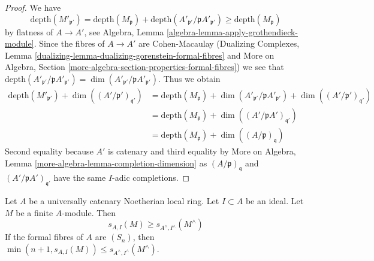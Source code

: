 \begin{proof}
We have
$$
\text{depth}(M'_{\mathfrak p'}) =
\text{depth}(M_\mathfrak p) +
\text{depth}(A'_{\mathfrak p'}/\mathfrak p A'_{\mathfrak p'})
\geq \text{depth}(M_\mathfrak p)
$$
by flatness of $A \to A'$, see
Algebra, Lemma \ref{algebra-lemma-apply-grothendieck-module}.
Since the fibres of $A \to A'$ are Cohen-Macaulay
(Dualizing Complexes, Lemma
\ref{dualizing-lemma-dualizing-gorenstein-formal-fibres} and
More on Algebra, Section
\ref{more-algebra-section-properties-formal-fibres})
we see that
$\text{depth}(A'_{\mathfrak p'}/\mathfrak p A'_{\mathfrak p'}) =
\dim(A'_{\mathfrak p'}/\mathfrak p A'_{\mathfrak p'})$.
Thus we obtain
\begin{align*}
\text{depth}(M'_{\mathfrak p'}) +
\dim((A'/\mathfrak p')_{\mathfrak q'})
& =
\text{depth}(M_\mathfrak p) +
\dim(A'_{\mathfrak p'}/\mathfrak p A'_{\mathfrak p'}) +
\dim((A'/\mathfrak p')_{\mathfrak q'}) \\
& =
\text{depth}(M_\mathfrak p) +
\dim((A'/\mathfrak p A')_{\mathfrak q'}) \\
& =
\text{depth}(M_\mathfrak p) +
\dim((A/\mathfrak p)_\mathfrak q)
\end{align*}
Second equality because $A'$ is catenary and third equality by
More on Algebra, Lemma \ref{more-algebra-lemma-completion-dimension}
as $(A/\mathfrak p)_\mathfrak q$ and $(A'/\mathfrak p A')_{\mathfrak q'}$
have the same $I$-adic completions.
\end{proof}





\begin{lemma}
\label{lemma-cutoff-completion}
Let $A$ be a universally catenary Noetherian local ring.
Let $I \subset A$ be an ideal. Let $M$ be
a finite $A$-module. Then
$$
s_{A, I}(M) \geq s_{A^\wedge, I^\wedge}(M^\wedge)
$$
If the formal fibres of $A$ are $(S_n)$, then
$\min(n + 1, s_{A, I}(M)) \leq s_{A^\wedge, I^\wedge}(M^\wedge)$.
\end{lemma}

